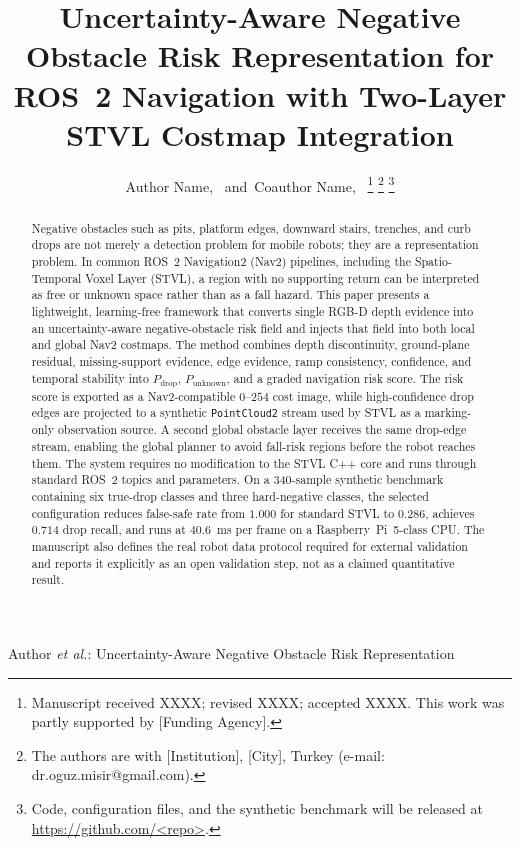 \documentclass[journal]{IEEEtran}
\begin{document}
\title{Uncertainty-Aware Negative Obstacle Risk Representation for ROS~2 Navigation
with Two-Layer STVL Costmap Integration}

\author{Author Name,~
        and~Coauthor Name,~%
\thanks{Manuscript received XXXX; revised XXXX; accepted XXXX. This work was
partly supported by [Funding Agency].}%
\thanks{The authors are with [Institution], [City], Turkey
(e-mail: dr.oguz.misir@gmail.com).}%
\thanks{Code, configuration files, and the synthetic benchmark will be released at
\url{https://github.com/<repo>}.}%
}

%
{Author \MakeLowercase{\textit{et al.}}: Uncertainty-Aware Negative Obstacle Risk Representation}

\maketitle

\begin{abstract}
Negative obstacles such as pits, platform edges, downward stairs, trenches, and curb drops
are not merely a detection problem for mobile robots; they are a representation problem.
In common ROS~2 Navigation2 (Nav2) pipelines, including the Spatio-Temporal Voxel Layer
(STVL), a region with no supporting return can be interpreted as free or unknown space
rather than as a fall hazard. This paper presents a lightweight, learning-free framework
that converts single RGB-D depth evidence into an uncertainty-aware negative-obstacle risk
field and injects that field into both local and global Nav2 costmaps. The method combines
depth discontinuity, ground-plane residual, missing-support evidence, edge evidence, ramp
consistency, confidence, and temporal stability into $P_\mathrm{drop}$,
$P_\mathrm{unknown}$, and a graded navigation risk score. The risk score is exported as
a Nav2-compatible $0$--$254$ cost image, while high-confidence drop edges are projected
to a synthetic \texttt{PointCloud2} stream used by STVL as a marking-only observation
source. A second global obstacle layer receives the same drop-edge stream, enabling the
global planner to avoid fall-risk regions before the robot reaches them. The system
requires no modification to the STVL C++ core and runs through standard ROS~2 topics and
parameters. On a 340-sample synthetic benchmark containing six true-drop classes and
three hard-negative classes, the selected configuration reduces false-safe rate from
$1.000$ for standard STVL to $0.286$, achieves $0.714$ drop recall, and runs at
$40.6$~ms per frame on a Raspberry~Pi~5-class CPU. The manuscript also defines the real
robot data protocol required for external validation and reports it explicitly as an
open validation step, not as a claimed quantitative result.
\end{abstract}
\end{document}
